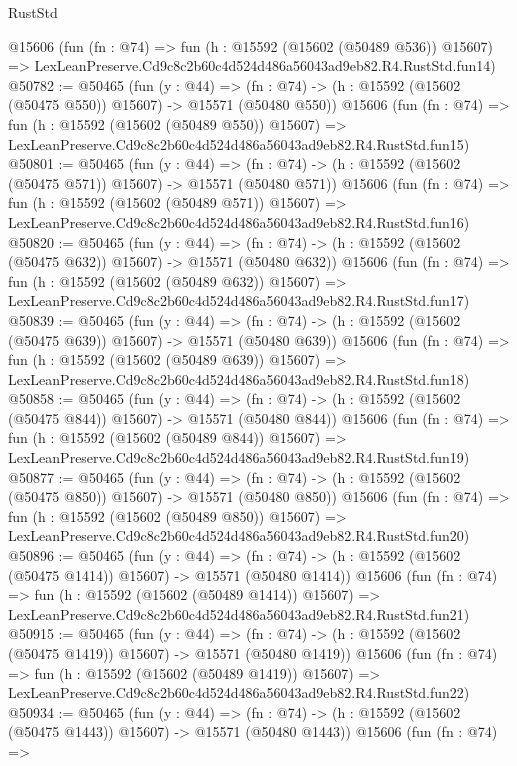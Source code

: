 \begin{lexlean}{RustStd}
\begin{coremodule}
    @15606
    (fun (fn : @74) =>
    fun (h : @15592 (@15602 (@50489 @536)) @15607) =>
    LexLeanPreserve.Cd9c8c2b60c4d524d486a56043ad9eb82.R4.RustStd.fun14)
@50782 := @50465
    (fun (y : @44) =>
    (fn : @74) -> (h : @15592 (@15602 (@50475 @550)) @15607) -> @15571 (@50480 @550))
    @15606
    (fun (fn : @74) =>
    fun (h : @15592 (@15602 (@50489 @550)) @15607) =>
    LexLeanPreserve.Cd9c8c2b60c4d524d486a56043ad9eb82.R4.RustStd.fun15)
@50801 := @50465
    (fun (y : @44) =>
    (fn : @74) -> (h : @15592 (@15602 (@50475 @571)) @15607) -> @15571 (@50480 @571))
    @15606
    (fun (fn : @74) =>
    fun (h : @15592 (@15602 (@50489 @571)) @15607) =>
    LexLeanPreserve.Cd9c8c2b60c4d524d486a56043ad9eb82.R4.RustStd.fun16)
@50820 := @50465
    (fun (y : @44) =>
    (fn : @74) -> (h : @15592 (@15602 (@50475 @632)) @15607) -> @15571 (@50480 @632))
    @15606
    (fun (fn : @74) =>
    fun (h : @15592 (@15602 (@50489 @632)) @15607) =>
    LexLeanPreserve.Cd9c8c2b60c4d524d486a56043ad9eb82.R4.RustStd.fun17)
@50839 := @50465
    (fun (y : @44) =>
    (fn : @74) -> (h : @15592 (@15602 (@50475 @639)) @15607) -> @15571 (@50480 @639))
    @15606
    (fun (fn : @74) =>
    fun (h : @15592 (@15602 (@50489 @639)) @15607) =>
    LexLeanPreserve.Cd9c8c2b60c4d524d486a56043ad9eb82.R4.RustStd.fun18)
@50858 := @50465
    (fun (y : @44) =>
    (fn : @74) -> (h : @15592 (@15602 (@50475 @844)) @15607) -> @15571 (@50480 @844))
    @15606
    (fun (fn : @74) =>
    fun (h : @15592 (@15602 (@50489 @844)) @15607) =>
    LexLeanPreserve.Cd9c8c2b60c4d524d486a56043ad9eb82.R4.RustStd.fun19)
@50877 := @50465
    (fun (y : @44) =>
    (fn : @74) -> (h : @15592 (@15602 (@50475 @850)) @15607) -> @15571 (@50480 @850))
    @15606
    (fun (fn : @74) =>
    fun (h : @15592 (@15602 (@50489 @850)) @15607) =>
    LexLeanPreserve.Cd9c8c2b60c4d524d486a56043ad9eb82.R4.RustStd.fun20)
@50896 := @50465
    (fun (y : @44) =>
    (fn : @74) -> (h : @15592 (@15602 (@50475 @1414)) @15607) -> @15571 (@50480 @1414))
    @15606
    (fun (fn : @74) =>
    fun (h : @15592 (@15602 (@50489 @1414)) @15607) =>
    LexLeanPreserve.Cd9c8c2b60c4d524d486a56043ad9eb82.R4.RustStd.fun21)
@50915 := @50465
    (fun (y : @44) =>
    (fn : @74) -> (h : @15592 (@15602 (@50475 @1419)) @15607) -> @15571 (@50480 @1419))
    @15606
    (fun (fn : @74) =>
    fun (h : @15592 (@15602 (@50489 @1419)) @15607) =>
    LexLeanPreserve.Cd9c8c2b60c4d524d486a56043ad9eb82.R4.RustStd.fun22)
@50934 := @50465
    (fun (y : @44) =>
    (fn : @74) -> (h : @15592 (@15602 (@50475 @1443)) @15607) -> @15571 (@50480 @1443))
    @15606
    (fun (fn : @74) =>

\end{coremodule}
\end{lexlean}
